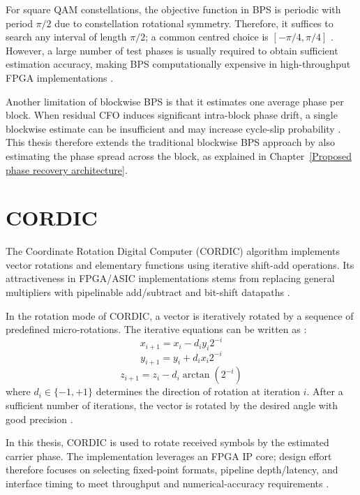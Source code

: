 For square QAM constellations, the objective function in BPS is periodic with period $\pi/2$
due to constellation rotational symmetry. Therefore, it suffices to search any interval of
length $\pi/2$; a common centred choice is $[-\pi/4,\pi/4]$ \cite{Pfau2009JLT}. However, a
large number of test phases is usually required to obtain sufficient estimation accuracy,
making BPS computationally expensive in high-throughput FPGA implementations
\cite{Pfau2009JLT,Yang2018OE}.

Another limitation of blockwise BPS is that it estimates one average phase per block. When
residual CFO induces significant intra-block phase drift, a single blockwise estimate can be
insufficient and may increase cycle-slip probability \cite{Pfau2009JLT}. This thesis therefore
extends the traditional blockwise BPS approach by also estimating the phase spread across the
block, as explained in Chapter~\ref{Proposed phase recovery architecture}.

\section{CORDIC}
The Coordinate Rotation Digital Computer (CORDIC) algorithm implements vector rotations and
elementary functions using iterative shift-add operations. Its attractiveness in FPGA/ASIC
implementations stems from replacing general multipliers with pipelinable add/subtract and
bit-shift datapaths \cite{Volder1959TEC,Meher2009TCASI}.

In the rotation mode of CORDIC, a vector is iteratively rotated by a sequence of predefined
micro-rotations. The iterative equations can be written as \cite{Volder1959TEC,Meher2009TCASI}:
\begin{equation}
x_{i+1} = x_i - d_i y_i 2^{-i}
\end{equation}
\begin{equation}
y_{i+1} = y_i + d_i x_i 2^{-i}
\end{equation}
\begin{equation}
z_{i+1} = z_i - d_i \arctan(2^{-i})
\end{equation}
where $d_i \in \{-1, +1\}$ determines the direction of rotation at iteration $i$.
After a sufficient number of iterations, the vector is rotated by the desired angle with
good precision \cite{Meher2009TCASI}.

In this thesis, CORDIC is used to rotate received symbols by the estimated carrier phase.
The implementation leverages an FPGA IP core; design effort therefore focuses on selecting
fixed-point formats, pipeline depth/latency, and interface timing to meet throughput and
numerical-accuracy requirements \cite{AMD2021PG105}.
  